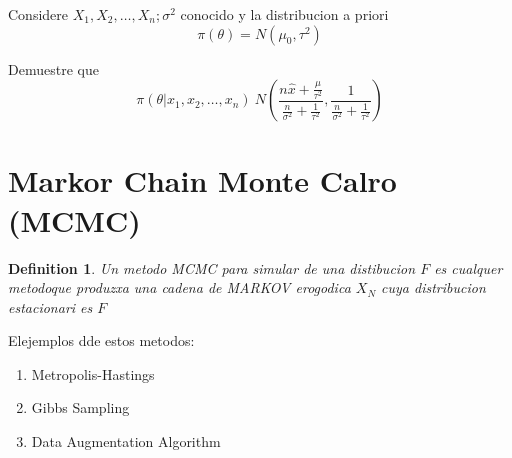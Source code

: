 \documentclass[10pt, oneside]{article}
\newtheorem{defn}{Definition}
\begin{document}
Considere $X_1, X_2, \ldots, X_n; \sigma^2$ conocido y la distribucion a priori
\[
	\pi(\theta) = N(\mu_0, \tau^2)
\]

Demuestre que
\[
	\pi(\theta|x_1, x_2, \ldots, x_n) ~ N(\frac{n\hat{x} + \frac{\mu}{\tau^2}}{\frac{n}{\sigma^2} +\frac{1}{\tau^2}}, \frac{1}{\frac{n}{\sigma^2} +\frac{1}{\tau^2}})
\]


\section{Markor Chain Monte Calro (MCMC)}

\begin{defn}
	Un metodo MCMC para simular de una distibucion $F$ es cualquer metodoque
	produzxa una cadena de MARKOV erogodica $X_N$ cuya distribucion
	estacionari es $F$
\end{defn}

Elejemplos dde estos metodos:
\begin{enumerate}
	\item Metropolis-Hastings
	\item Gibbs Sampling
	\item Data Augmentation Algorithm
\end{enumerate}
\end{document}
